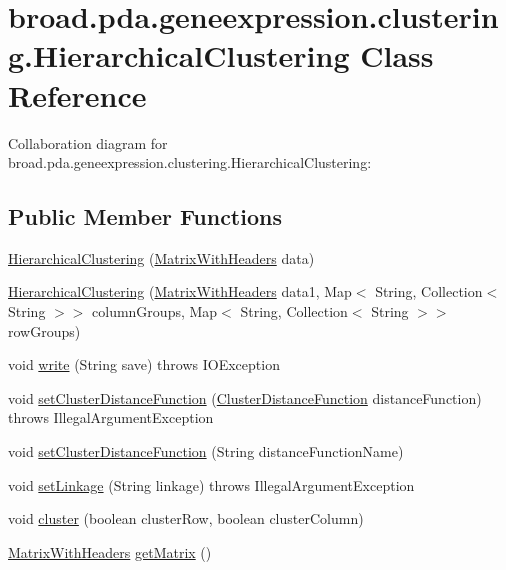 \hypertarget{classbroad_1_1pda_1_1geneexpression_1_1clustering_1_1_hierarchical_clustering}{\section{broad.\+pda.\+geneexpression.\+clustering.\+Hierarchical\+Clustering Class Reference}
\label{classbroad_1_1pda_1_1geneexpression_1_1clustering_1_1_hierarchical_clustering}
}


Collaboration diagram for broad.\+pda.\+geneexpression.\+clustering.\+Hierarchical\+Clustering\+:
\subsection*{Public Member Functions}
\begin{DoxyCompactItemize}
\item 
\hyperlink{classbroad_1_1pda_1_1geneexpression_1_1clustering_1_1_hierarchical_clustering_a4a79fa62751a971d7f6e0671df21266e}{Hierarchical\+Clustering} (\hyperlink{classbroad_1_1core_1_1datastructures_1_1_matrix_with_headers}{Matrix\+With\+Headers} data)
\item 
\hyperlink{classbroad_1_1pda_1_1geneexpression_1_1clustering_1_1_hierarchical_clustering_ac57f650bd84503e15ed4d0a80f3ad387}{Hierarchical\+Clustering} (\hyperlink{classbroad_1_1core_1_1datastructures_1_1_matrix_with_headers}{Matrix\+With\+Headers} data1, Map$<$ String, Collection$<$ String $>$$>$ column\+Groups, Map$<$ String, Collection$<$ String $>$$>$ row\+Groups)
\item 
void \hyperlink{classbroad_1_1pda_1_1geneexpression_1_1clustering_1_1_hierarchical_clustering_a7d0b43d95c1bf4d161c51462e13ade49}{write} (String save)  throws I\+O\+Exception
\item 
void \hyperlink{classbroad_1_1pda_1_1geneexpression_1_1clustering_1_1_hierarchical_clustering_a4b12cc4e37e5ea21f76aab5738c0cfbf}{set\+Cluster\+Distance\+Function} (\hyperlink{interfacebroad_1_1pda_1_1geneexpression_1_1clustering_1_1_cluster_distance_function}{Cluster\+Distance\+Function} distance\+Function)  throws Illegal\+Argument\+Exception
\item 
void \hyperlink{classbroad_1_1pda_1_1geneexpression_1_1clustering_1_1_hierarchical_clustering_abc3cb1d0ba472bbcee40bb151bc4b209}{set\+Cluster\+Distance\+Function} (String distance\+Function\+Name)
\item 
void \hyperlink{classbroad_1_1pda_1_1geneexpression_1_1clustering_1_1_hierarchical_clustering_a8e710d388508dce2b03f6dc4dde37fdc}{set\+Linkage} (String linkage)  throws Illegal\+Argument\+Exception 
\item 
void \hyperlink{classbroad_1_1pda_1_1geneexpression_1_1clustering_1_1_hierarchical_clustering_a54cae450cf75f5336ea4175a061207c5}{cluster} (boolean cluster\+Row, boolean cluster\+Column)
\item 
\hyperlink{classbroad_1_1core_1_1datastructures_1_1_matrix_with_headers}{Matrix\+With\+Headers} \hyperlink{classbroad_1_1pda_1_1geneexpression_1_1clustering_1_1_hierarchical_clustering_ad1e80a17182c37cd9689d8ab1514b7ab}{get\+Matrix} ()
\end{DoxyCompactItemize}
